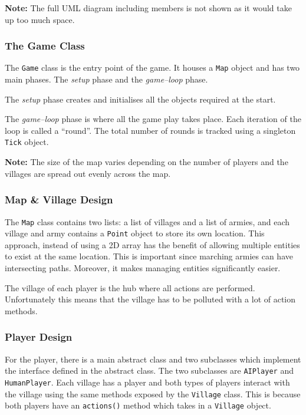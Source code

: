 \documentclass[12pt]{article}
\begin{document}
\textbf{Note:} The full UML diagram including members is not
shown as it would take up too much space.

\subsubsection{The Game Class}

The \texttt{Game} class is the entry point of the game. It
houses a \texttt{Map} object and has two main phases. The
\textit{setup} phase and the \textit{game--loop} phase.

The \textit{setup} phase creates and initialises all the objects
required at the start.

The \textit{game--loop} phase is where all the game play takes
place. Each iteration of the loop is called a ``round''. The
total number of rounds is tracked using a singleton
\texttt{Tick} object.

\textbf{Note:} The size of the map varies depending on the
number of players and the villages are spread out evenly across
the map.

\subsubsection{Map \& Village Design}

The \texttt{Map} class contains two lists: a list of villages
and a list of armies, and each village and army contains a
\texttt{Point} object to store its own location. This approach,
instead of using a 2D array has the benefit of allowing multiple
entities to exist at the same location. This is important since
marching armies can have intersecting paths. Moreover, it makes
managing entities significantly easier.

The village of each player is the hub where all actions are
performed. Unfortunately this means that the village has to be
polluted with a lot of action methods.

\subsubsection{Player Design}

For the player, there is a main abstract class and two
subclasses which implement the interface defined in the abstract
class. The two subclasses are \texttt{AIPlayer} and
\texttt{HumanPlayer}. Each village has a player and both types
of players interact with the village using the same methods
exposed by the \texttt{Village} class. This is because both
players have an \texttt{actions()} method which takes in a
\texttt{Village} object.
\end{document}

